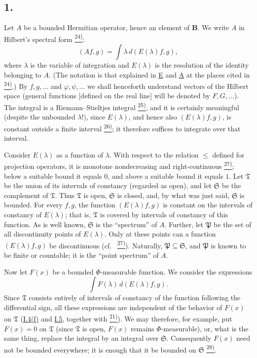 \documentclass[12pt,b5paper,twoside]{article}
\newcommand{\noteref}[1]{%
  \hyperlink{note:#1}{\textsuperscript{#1)}}}
\begin{document}
\subsection*{1.}
\label{sec:II.1}
Let $A$ be a bounded Hermitian operator, hence an element of $\mathbf B$. We write $A$ in Hilbert's spectral form\noteref{24}:
\label{eq:Hilbert-spectral-form}
\begin{equation*}
 (Af,g)=\int \lambda\,d(E(\lambda)f,g),
\end{equation*}
where $\lambda$ is the variable of integration and $E(\lambda)$ is the resolution of the identity belonging to $A$. (The notation is that explained in \hyperref[ref:E]{E} and \hyperref[ref:A]{A} at the places cited in \noteref{24}.) By $f,g,\ldots$ and $\varphi,\psi,\ldots$ we shall henceforth understand
vectors of the Hilbert space (general functions [defined on the real line] will be denoted by
\(F,G,\ldots\)).  The integral is a Riemann--Stieltjes integral\noteref{25}, and
it is certainly meaningful (despite the unbounded \(\lambda\)!), since
\(E(\lambda)\), and hence also \((E(\lambda)f,g)\), is constant outside a finite
interval\noteref{26}; it therefore suffices to integrate over that interval.

Consider \(E(\lambda)\) as a function of \(\lambda\).  With respect to the
relation \(\leq\) defined for projection operators, it is monotone
nondecreasing and right-continuous\noteref{27}; below a suitable bound it
equals \(0\), and above a suitable bound it equals \(1\).  Let \(\mathfrak T\)
be the union of its intervals of constancy (regarded as open), and let
\(\mathfrak S\) be the complement of \(\mathfrak T\).  Thus \(\mathfrak T\) is
open, \(\mathfrak S\) is closed, and, by what was just said, \(\mathfrak S\) is
bounded.  For every \(f,g\), the function \((E(\lambda)f,g)\) is constant on
the intervals of constancy of \(E(\lambda)\); that is, \(\mathfrak T\) is
covered by intervals of constancy of this function.  As is well known,
\(\mathfrak S\) is the ``spectrum'' of \(A\).  Further, let \(\mathfrak P\) be
the set of all discontinuity points of \(E(\lambda)\).  Only at these points
can a function \((E(\lambda)f,g)\) be discontinuous (cf.\ \noteref{27}).
Naturally, \(\mathfrak P\subseteq\mathfrak S\), and \(\mathfrak P\) is known
to be finite or countable; it is the ``point spectrum'' of \(A\).

Now let \(F(x)\) be a bounded \(\Phi\)-measurable function.  We consider the
expressions
\[
  \int F(\lambda)\,d(E(\lambda)f,g).
\]
Since \(\mathfrak T\) consists entirely of intervals of constancy of the
function following the differential sign, all these expressions are
independent of the behavior of \(F(x)\) on \(\mathfrak T\)
(\hyperref[prop:I.4.f]{I.4(f)} and \hyperref[sec:I.5]{I.5}, together with
\noteref{21}).  We may therefore, for example, put \(F(x)=0\) on
\(\mathfrak T\) (since \(\mathfrak T\) is open, \(F(x)\) remains
\(\Phi\)-measurable), or, what is the same thing, replace the integral by an
integral over \(\mathfrak S\).  Consequently \(F(x)\) need not be bounded
everywhere; it is enough that it be bounded on \(\mathfrak S\)\noteref{28}.
\end{document}

